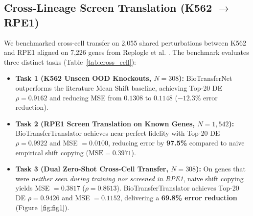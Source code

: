 \documentclass[11pt,letterpaper]{article}
\begin{document}
\subsection{Cross-Lineage Screen Translation (\texorpdfstring{K562 $\to$ RPE1}{K562 to RPE1})}
We benchmarked cross-cell transfer on 2,055 shared perturbations between K562 and RPE1 aligned on 7,226 genes from Replogle et al. \cite{replogle2022mapping}. The benchmark evaluates three distinct tasks (Table~\ref{tab:cross_cell}):
\begin{itemize}
    \item \textbf{Task 1 (K562 Unseen OOD Knockouts, $N=308$):} BioTransferNet outperforms the literature Mean Shift baseline, achieving Top-20 DE $\rho = 0.9162$ and reducing MSE from $0.1308$ to $0.1148$ ($-12.3\%$ error reduction).
    \item \textbf{Task 2 (RPE1 Screen Translation on Known Genes, $N=1,542$):} BioTransferTranslator achieves near-perfect fidelity with Top-20 DE $\rho = 0.9922$ and MSE $= 0.0100$, reducing error by \textbf{97.5\%} compared to naive empirical shift copying ($\text{MSE} = 0.3971$).
    \item \textbf{Task 3 (Dual Zero-Shot Cross-Cell Transfer, $N=308$):} On genes that were \textit{neither seen during training nor screened in RPE1}, naive shift copying yields MSE $= 0.3817$ ($\rho = 0.8613$). BioTransferTranslator achieves Top-20 DE $\rho = 0.9426$ and MSE $= 0.1152$, delivering a \textbf{69.8\% error reduction} (Figure~\ref{fig:fig1}).
\end{itemize}
\end{document}
